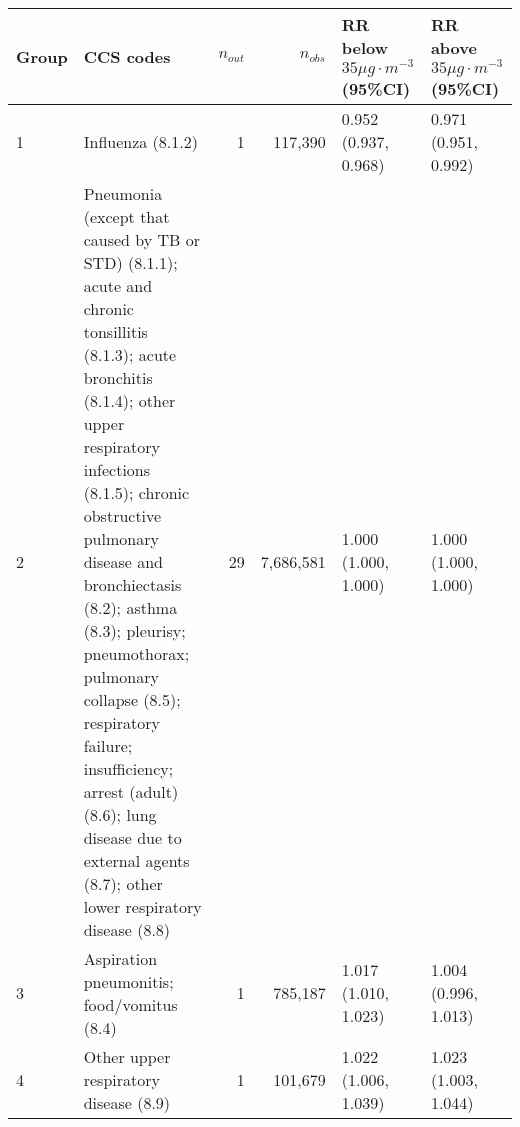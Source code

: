 \begin{tabular}{lp{6.5cm}rrp{2.2cm}p{2.2cm}}
  \hline
Group & CCS codes & $n_{out}$ & $n_{obs}$ & RR below $35 \mu g \cdot m^{-3}$ (95\%CI) & RR above $35 \mu g \cdot m^{-3}$ (95\%CI) \\ 
  \hline
   1 & Influenza (8.1.2) &    1 & 117,390 & 0.952 (0.937, 0.968) & 0.971 (0.951, 0.992) \\ 
     2 & Pneumonia (except that caused by TB or STD) (8.1.1); acute and chronic tonsillitis (8.1.3); acute bronchitis (8.1.4); other upper respiratory infections (8.1.5); chronic obstructive pulmonary disease and bronchiectasis (8.2); asthma (8.3); pleurisy; pneumothorax; pulmonary collapse (8.5); respiratory failure; insufficiency; arrest (adult) (8.6); lung disease due to external agents (8.7); other lower respiratory disease (8.8) &   29 & 7,686,581 & 1.000 (1.000, 1.000) & 1.000 (1.000, 1.000) \\ 
     3 & Aspiration pneumonitis; food/vomitus (8.4) &    1 & 785,187 & 1.017 (1.010, 1.023) & 1.004 (0.996, 1.013) \\ 
     4 & Other upper respiratory disease (8.9) &    1 & 101,679 & 1.022 (1.006, 1.039) & 1.023 (1.003, 1.044) \\ 
   \hline
\end{tabular}

